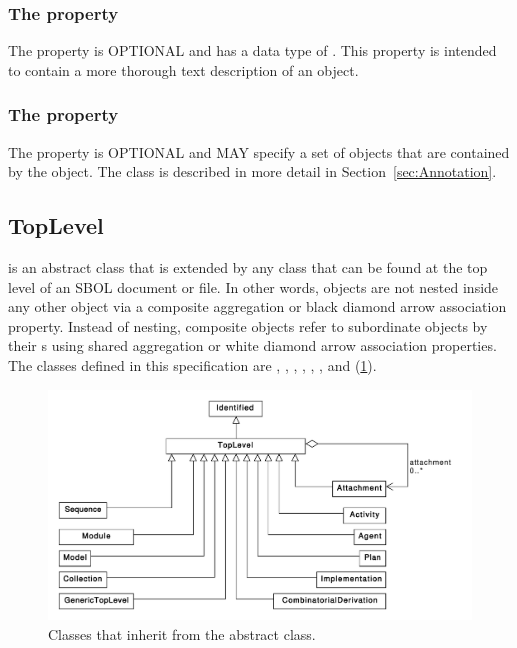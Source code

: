 \subsubsection*{The  property}
\label{sec:description}

The  property is OPTIONAL and has a data type of . This property is intended to contain a more thorough text description of an  object.

\subsubsection*{The  property}
\label{sec:annotations}

The  property is OPTIONAL and MAY specify a set of  objects that are contained by the  object. The  class is described in more detail in Section~\ref{sec:Annotation}.

\subsection {TopLevel}
\label{sec:TopLevel}
 is an abstract class that is extended by any  class that can be found at the top level of an SBOL document or file. In other words,  objects are not nested inside any other object via a composite aggregation or black diamond arrow association property. Instead of nesting, composite  objects refer to subordinate  objects by their s using shared aggregation or white diamond arrow association properties. The  classes defined in this specification are , , , , , , and (\ref{uml:toplevel}).


\begin{figure}[ht]
\begin{center}
\includegraphics[width=\textwidth]{uml/toplevel}
\caption[]{Classes that inherit from the  abstract class.}
\label{uml:toplevel}
\end{center}
\end{figure}


